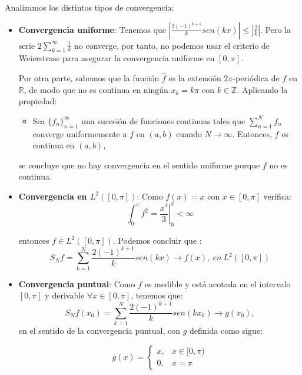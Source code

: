 \documentclass[bibnumbers, palatino]{apuntes}
\begin{document}
Analizamos los distintos tipos de convergencia:
\begin{itemize}
\item \textbf{Convergencia uniforme}: Tenemos que $|\frac{2(-1)^{k+1}}{k} sen(kx)|\leq |\frac{2}{k}|$. Pero la serie $2\sum^{\infty}_{k=1}\frac{1}{k}$ no converge, por tanto, no podemos usar el criterio de Weierstrass para asegurar la convergencia uniforme en $[0,\pi]$.

Por otra parte, sabemos que la función $\hat{f}$ es la extensión $2\pi$-periódica de $f$ en $\mathbb{R}$, de modo que no es continua en ningún $x_k = k\pi$ con $k\in \mathbb{Z}$. Aplicando la propiedad:
\begin{itemize}
\item Sea $\{f_n\}_{n=1}^{\infty}$ una sucesión de funciones continuas tales que $\sum^{N}_{n=1}f_n$ converge uniformemente a $f$ en $(a,b)$ cuando $N\rightarrow \infty$. Entonces, $f$ es continua en $(a,b)$,
\end{itemize} 
se concluye que no hay convergencia en el sentido uniforme porque $f$ no es continua.

\item \textbf{Convergencia en $L^2([0,\pi])$}: Como $f(x) = x$ con $x\in[0,\pi]$ verifica:
\[\int^{\pi}_{0}f^2 = \left.\frac{x^3}{3}\right|^{\pi}_{0} < \infty\]

entonces $f\in L^2([0,\pi])$. Podemos concluir que :
\[S_N f = \sum^{N}_{k=1} \frac{2(-1)^{k+1}}{k} sen(kx) \longrightarrow f(x), ~en~ L^2([0,\pi])\]

\item \textbf{Convergencia puntual}: Como $f$ es medible y está acotada en el intervalo $[0,\pi]$ y derivable $\forall x\in[0,\pi]$, tenemos que:
\[S_N f(x_0) = \sum^{N}_{k=1} \frac{2(-1)^{k+1}}{k} sen(kx_0) \longrightarrow g(x_0), \] en el sentido de la convergencia puntual, con $g$ definida como sigue:

$$g(x) = \begin{cases}x, & x\in[0,\pi)\\ 0, & x=\pi\end{cases}$$
\end{itemize}
\end{document}
